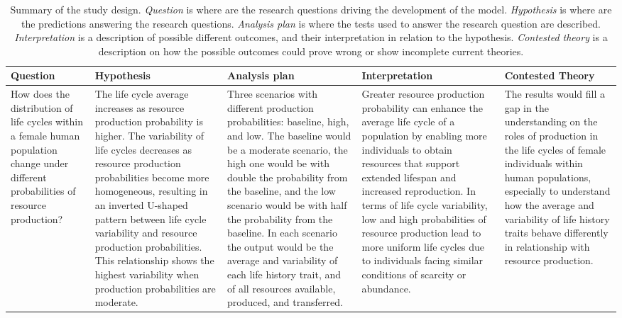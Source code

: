 \documentclass{article}
\begin{document}
\begin{table}[H]
    \centering
    \caption{Summary of the study design. \emph{Question} is where are the research questions driving the development of the model. \emph{Hypothesis} is where are the predictions answering the research questions. \emph{Analysis plan} is where the tests used to answer the research question are described. \emph{Interpretation} is a description of possible different outcomes, and their interpretation in relation to the hypothesis. \emph{Contested theory} is a description on how the possible outcomes could prove wrong or show incomplete current theories.}
    \begin{adjustbox}{width=\textwidth}
    \begin{tabular}{p{4cm}p{4cm}p{4cm}p{4cm}p{4cm} }
    \hline
    Question & Hypothesis & Analysis plan & Interpretation & Contested Theory \\ 
    \hline
    How does the distribution of life cycles within a female human population change under different probabilities of resource production? & The life cycle average increases as resource production probability is higher. The variability of life cycles decreases as resource production probabilities become more homogeneous, resulting in an inverted U-shaped pattern between life cycle variability and resource production probabilities. This relationship shows the highest variability when production probabilities are moderate. & Three scenarios with different production probabilities: baseline, high, and low. The baseline would be a moderate scenario, the high one would be with double the probability from the baseline, and the low scenario would be with half the probability from the baseline. In each scenario the output would be the average and variability of each life history trait, and of all resources available, produced, and transferred. & Greater resource production probability can enhance the average life cycle of a population by enabling more individuals to obtain resources that support extended lifespan and increased reproduction. In terms of life cycle variability, low and high probabilities of resource production lead to more uniform life cycles due to individuals facing similar conditions of scarcity or abundance. & The results would fill a gap in the understanding on the roles of production in the life cycles of female individuals within human populations, especially to understand how the average and variability of life history traits behave differently in relationship with resource production.\\
    

\end{tabular}
\end{adjustbox}
\end{table}
\end{document}
